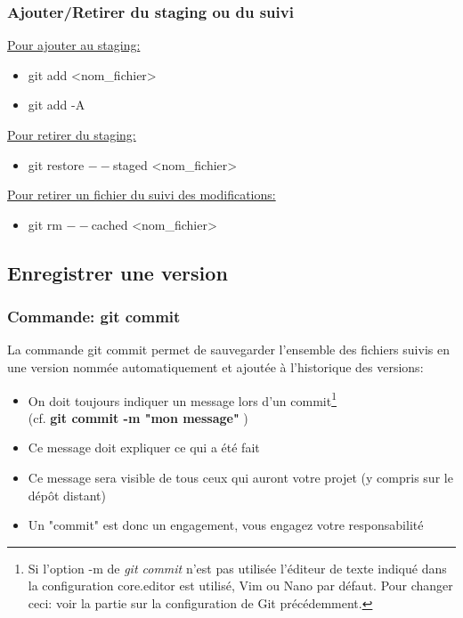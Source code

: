 \documentclass{beamer}
\begin{document}
\begin{frame}
\frametitle{Ajouter/Retirer du staging ou du suivi}

\underline{Pour ajouter au staging:}
\smallskip
\begin{itemize}
    \item[] git add <nom\_fichier>
    \item[] git add -A
\end{itemize}
\bigskip

\underline{Pour retirer du staging:}
\smallskip
\begin{itemize}
    \item[] git restore $--$staged <nom\_fichier>
\end{itemize}
\bigskip

\underline{Pour retirer un fichier du suivi des modifications:}
\smallskip
\begin{itemize}
    \item[] git rm $--$cached <nom\_fichier>
\end{itemize}

\end{frame}

\subsection{Enregistrer une version}

\begin{frame}
\frametitle{Commande: git commit}
La commande git commit permet de sauvegarder l'ensemble des fichiers suivis en une version nommée automatiquement et ajoutée à l'historique des versions:
\smallskip
\begin{itemize}
    \item On doit toujours indiquer un message lors d'un commit\footnote[frame]{ Si l'option -m de \textit{git commit} n'est pas utilisée l'éditeur de texte indiqué dans la configuration core.editor est utilisé, Vim ou Nano par défaut. Pour changer ceci: voir la partie sur la configuration de Git précédemment. }\\
    (cf. \textbf{git commit -m "mon message"} )
    \item Ce message doit expliquer ce qui a été fait
    \item Ce message sera visible de tous ceux qui auront votre projet (y compris sur le dépôt distant)
    \item Un "commit" est donc un engagement, vous engagez votre responsabilité
\end{itemize}


\end{frame}
\end{document}
